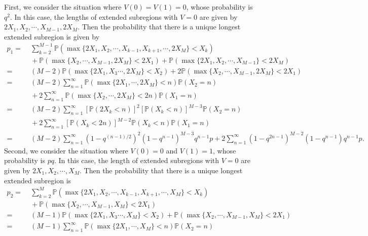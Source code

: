 \documentclass[a4paper,11pt]{article}
\begin{document}
\begin{appendices}
First, we consider the situation where $V(0) = V(1) = 0$, whose probability is $q^2$. In this case, the lengths of extended subregions with $V = 0$ are given by $2 X_1, X_2, \cdots, X_{M-1}, 2 X_M$. Then the probability that there is a unique longest extended subregion is given by
\begin{equation*}
\begin{split}
p_1 = &\; \sum_{k=2}^{M-1} \mathbb{P}(\max\{2 X_1, X_2, \cdots, X_{k-1}, X_{k+1}, \cdots, 2 X_{M}\} < X_k) \\
&\; + \mathbb{P}(\max\{X_2, \cdots, X_{M-1}, 2 X_M\} < 2 X_1) + \mathbb{P}(\max\{2 X_1, X_2, \cdots, X_{M-1}\} < 2 X_M) \\
= &\; (M-2) \mathbb{P}(\max\{2 X_1, X_3 \cdots, 2 X_{M}\} < X_2) + 2 \mathbb{P}(\max\{X_2, \cdots, X_{M-1}, 2 X_M\} < 2 X_1) \\
= &\; (M-2) \sum_{n=1}^{\infty} \mathbb{P}(\max\{2 X_1, \cdots, 2 X_{M}\} < n) \mathbb{P}(X_2 = n) \\
&\; + 2 \sum_{n=1}^{\infty} \mathbb{P}(\max\{X_2, \cdots, 2 X_M\} < 2 n) \mathbb{P}(X_1 = n) \\
= &\; (M-2) \sum_{n=1}^{\infty} [\mathbb{P}(2 X_k < n)]^2 [\mathbb{P}(X_k < n)]^{M-3} \mathbb{P}(X_2 = n) \\
&\; + 2 \sum_{n=1}^{\infty} [\mathbb{P}(X_k < 2 n)]^{M-2} \mathbb{P}(X_k < n) \mathbb{P}(X_1 = n) \\
= &\; (M-2) \sum_{n=1}^{\infty} (1 - q^{(n-1)/2})^2 (1 - q^{n-1})^{M-3} q^{n-1} p + 2 \sum_{n=1}^{\infty} (1 - q^{2n-1})^{M-2} (1 - q^{n-1}) q^{n-1} p.
\end{split}
\end{equation*}
Second, we consider the situation where $V(0) = 0$ and $V(1) = 1$, whose probability is $p q$. In this case, the length of extended subregions with $V = 0$ are given by $2 X_1, X_2, \cdots, X_M$. Then the probability that there is a unique longest extended subregion is
\begin{equation*}
\begin{split}
p_2 = &\; \sum_{k=2}^{M} \mathbb{P}(\max\{2 X_1, X_2, \cdots, X_{k-1}, X_{k+1}, \cdots, X_{M}\} < X_k) \\
&\; + \mathbb{P}(\max\{X_2, \cdots, X_{M-1}, X_M\} < 2 X_1) \\
= &\; (M-1) \mathbb{P}(\max\{2 X_1, X_3 \cdots, X_{M}\} < X_2) + \mathbb{P}(\max\{X_2, \cdots, X_{M-1}, X_M\} < 2 X_1) \\
= &\; (M-1) \sum_{n=1}^{\infty} \mathbb{P}(\max\{2 X_1, \cdots, X_{M}\} < n) \mathbb{P}(X_2 = n) \\

\end{split}
\end{equation*}
\end{appendices}
\end{document}

